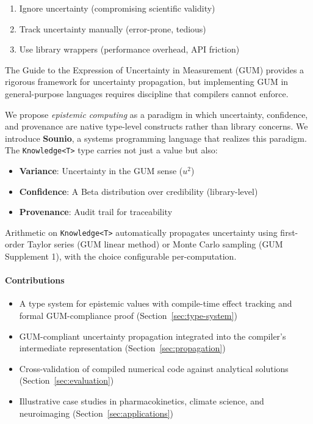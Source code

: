 \documentclass[11pt,a4paper]{article}
\begin{document}
\begin{enumerate}
  \item Ignore uncertainty (compromising scientific validity)
  \item Track uncertainty manually (error-prone, tedious)
  \item Use library wrappers (performance overhead, API friction)
\end{enumerate}

The Guide to the Expression of Uncertainty in Measurement (GUM)
\citep{jcgm2008gum} provides a rigorous framework for uncertainty propagation,
but implementing GUM in general-purpose languages requires discipline that
compilers cannot enforce.

We propose \emph{epistemic computing} as a paradigm in which uncertainty,
confidence, and provenance are native type-level constructs rather than
library concerns. We introduce \textbf{Sounio}, a systems programming language
that realizes this paradigm. The \texttt{Knowledge<T>} type
carries not just a value but also:

\begin{itemize}
  \item \textbf{Variance}: Uncertainty in the GUM sense ($u^2$)
  \item \textbf{Confidence}: A Beta distribution over credibility (library-level)
  \item \textbf{Provenance}: Audit trail for traceability
\end{itemize}

Arithmetic on \texttt{Knowledge<T>} automatically propagates uncertainty using
first-order Taylor series (GUM linear method) or Monte Carlo sampling (GUM
Supplement 1), with the choice configurable per-computation.

\paragraph{Contributions}
\begin{itemize}
  \item A type system for epistemic values with compile-time effect tracking
        and formal GUM-compliance proof (Section~\ref{sec:type-system})
  \item GUM-compliant uncertainty propagation integrated into the compiler's
        intermediate representation (Section~\ref{sec:propagation})
  \item Cross-validation of compiled numerical code against analytical
        solutions (Section~\ref{sec:evaluation})
  \item Illustrative case studies in pharmacokinetics, climate science, and
        neuroimaging (Section~\ref{sec:applications})
\end{itemize}
\end{document}
